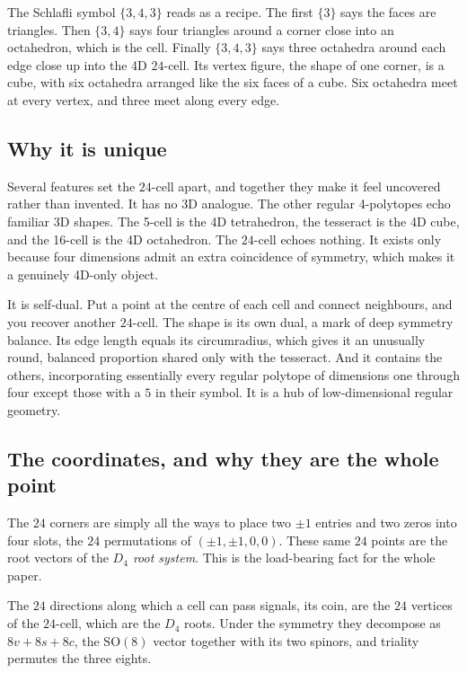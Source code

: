 The Schlafli symbol $\{3,4,3\}$ reads as a recipe. The first $\{3\}$ says the faces are triangles. Then $\{3,4\}$ says four triangles around a corner close into an octahedron, which is the cell. Finally $\{3,4,3\}$ says three octahedra around each edge close up into the 4D $24$-cell. Its vertex figure, the shape of one corner, is a cube, with six octahedra arranged like the six faces of a cube. Six octahedra meet at every vertex, and three meet along every edge.

\subsection{Why it is unique}

Several features set the $24$-cell apart, and together they make it feel uncovered rather than invented. It has no 3D analogue. The other regular 4-polytopes echo familiar 3D shapes. The 5-cell is the 4D tetrahedron, the tesseract is the 4D cube, and the 16-cell is the 4D octahedron. The $24$-cell echoes nothing. It exists only because four dimensions admit an extra coincidence of symmetry, which makes it a genuinely 4D-only object.

It is self-dual. Put a point at the centre of each cell and connect neighbours, and you recover another $24$-cell. The shape is its own dual, a mark of deep symmetry balance. Its edge length equals its circumradius, which gives it an unusually round, balanced proportion shared only with the tesseract. And it contains the others, incorporating essentially every regular polytope of dimensions one through four except those with a $5$ in their symbol. It is a hub of low-dimensional regular geometry.

\subsection{The coordinates, and why they are the whole point}

The $24$ corners are simply all the ways to place two $\pm 1$ entries and two zeros into four slots, the $24$ permutations of $(\pm 1, \pm 1, 0, 0)$. These same $24$ points are the root vectors of the \emph{$D_4$ root system}. This is the load-bearing fact for the whole paper.

\begin{result}
The $24$ directions along which a cell can pass signals, its coin, are the $24$ vertices of the $24$-cell, which are the $D_4$ roots. Under the symmetry they decompose as $8v + 8s + 8c$, the $\mathrm{SO}(8)$ vector together with its two spinors, and triality permutes the three eights.
\end{result}

